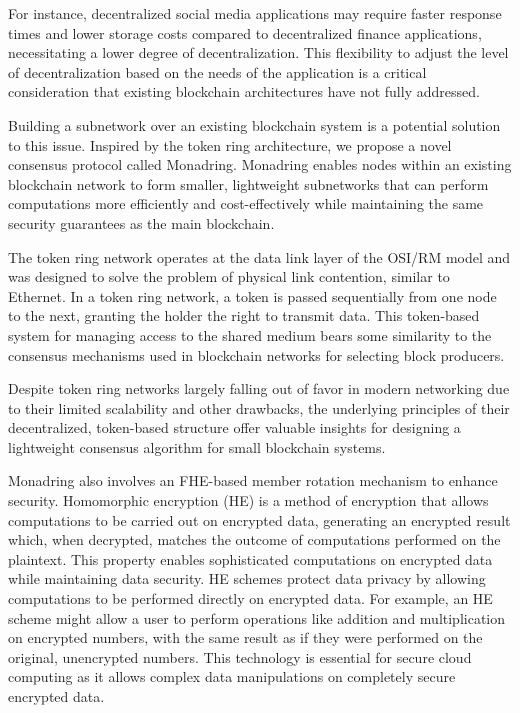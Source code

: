 \documentclass[11pt]{article}
\begin{document}
For instance, decentralized social media applications may require faster response times and lower storage costs compared to decentralized finance applications, necessitating a lower degree of decentralization. This flexibility to adjust the level of decentralization based on the needs of the application is a critical consideration that existing blockchain architectures have not fully addressed.

Building a subnetwork over an existing blockchain system is a potential solution to this issue. Inspired by the token ring architecture, we propose a novel consensus protocol called Monadring. Monadring enables nodes within an existing blockchain network to form smaller, lightweight subnetworks that can perform computations more efficiently and cost-effectively while maintaining the same security guarantees as the main blockchain.

The token ring network operates at the data link layer of the OSI/RM model and was designed to solve the problem of physical link contention, similar to Ethernet. In a token ring network, a token is passed sequentially from one node to the next, granting the holder the right to transmit data. This token-based system for managing access to the shared medium bears some similarity to the consensus mechanisms used in blockchain networks for selecting block producers.

Despite token ring networks largely falling out of favor in modern networking due to their limited scalability and other drawbacks, the underlying principles of their decentralized, token-based structure offer valuable insights for designing a lightweight consensus algorithm for small blockchain systems.

Monadring also involves an FHE-based member rotation mechanism to enhance security. Homomorphic encryption (HE) \cite{acar2018survey} is a method of encryption that allows computations to be carried out on encrypted data, generating an encrypted result which, when decrypted, matches the outcome of computations performed on the plaintext. This property enables sophisticated computations on encrypted data while maintaining data security. HE schemes protect data privacy by allowing computations to be performed directly on encrypted data. For example, an HE scheme might allow a user to perform operations like addition and multiplication on encrypted numbers, with the same result as if they were performed on the original, unencrypted numbers. This technology is essential for secure cloud computing as it allows complex data manipulations on completely secure encrypted data.
\end{document}
